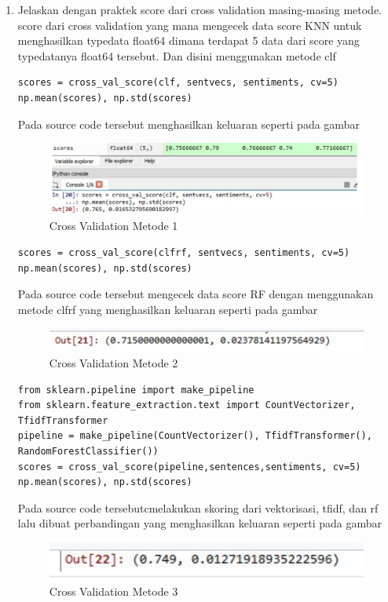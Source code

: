 \begin{enumerate}
\item Jelaskan dengan praktek score dari cross validation masing-masing metode.
\subitem score dari cross validation yang mana mengecek data score KNN untuk menghasilkan typedata float64 dimana terdapat 5 data dari score yang typedatanya float64 tersebut. Dan disini menggunakan metode clf
\begin{verbatim}
scores = cross_val_score(clf, sentvecs, sentiments, cv=5)
np.mean(scores), np.std(scores)
\end{verbatim}
\subitem Pada source code tersebut menghasilkan keluaran seperti pada gambar 
\begin{figure}[!htbp]
	\centerline{\includegraphics[width=1\textwidth]{figures/andi/T7.PNG}}
	\caption{Cross Validation Metode 1}
\end{figure}

\begin{verbatim}
scores = cross_val_score(clfrf, sentvecs, sentiments, cv=5)
np.mean(scores), np.std(scores)
\end{verbatim}
\subitem Pada source code tersebut mengecek data score RF dengan menggunakan metode clfrf yang menghasilkan keluaran seperti pada gambar 
\begin{figure}[!htbp]
	\centerline{\includegraphics[width=1\textwidth]{figures/andi/T8.PNG}}
	\caption{Cross Validation Metode 2}
\end{figure}

\begin{verbatim}
from sklearn.pipeline import make_pipeline
from sklearn.feature_extraction.text import CountVectorizer, TfidfTransformer
pipeline = make_pipeline(CountVectorizer(), TfidfTransformer(), RandomForestClassifier())
scores = cross_val_score(pipeline,sentences,sentiments, cv=5)
np.mean(scores), np.std(scores)
\end{verbatim}
\subitem Pada source code tersebutcmelakukan skoring dari vektorisasi, tfidf, dan rf lalu dibuat perbandingan yang menghasilkan keluaran seperti pada gambar 
\begin{figure}[!htbp]
	\centerline{\includegraphics[width=1\textwidth]{figures/andi/T9.PNG}}
	\caption{Cross Validation Metode 3}
\end{figure}
\end{enumerate}



